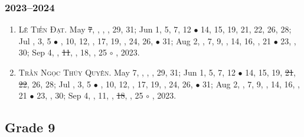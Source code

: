 \documentclass{article}
\begin{document}
\subsubsection{2023--2024}

\begin{enumerate}
	\item \textsc{Lê Tiến Đạt.} May \st{7}, , , , 29, 31; Jun 1, 5, 7, 12 $\bullet$ 14, 15, 19, 21, 22, 26, 28; Jul , 3, 5 $\bullet$ , 10, 12, , 17, 19, , 24, 26,  $\bullet$ 31; Aug 2, , 7, 9, , 14, 16, , 21 $\bullet$ 23, , 30; Sep 4, , \st{11}, , 18, , 25 $\circ$ , 2023.
	\item \textsc{Trần Ngọc Thúy Quyên.} May 7, , , , 29, 31; Jun 1, 5, 7, 12 $\bullet$ 14, 15, 19, \st{21}, \st{22}, 26, 28; Jul , 3, 5 $\bullet$ , 10, 12, , 17, 19, , 24, 26,  $\bullet$ 31; Aug 2, , 7, 9, , 14, 16, , 21 $\bullet$ 23, , 30; Sep 4, , 11, , \st{18}, , 25 $\circ$ , 2023.
\end{enumerate}


\subsection{Grade 9}
\end{document}
